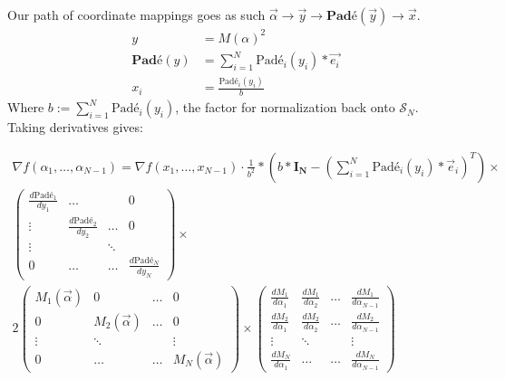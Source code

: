 \documentclass[10pt]{article}
\begin{document}
Our path of coordinate mappings goes as such $\vec{\alpha} \to \vec{y} \to {\textbf{Pad\'{e}}(\vec{y})} \to \vec{x}$. 
\begin{align*}
	y &= M(\alpha)^2 \\
	\textbf{Pad\'{e}}(y) &= \sum_{i=1}^N \text{Pad\'{e}}_i(y_i)* \vec{e_i} \\ 
	x_i &= \frac{\text{Pad\'{e}}_i(y_i)}{b}
\end{align*}
Where $b := \sum_{i=1}^N \text{Pad\'{e}}_i(y_i) $, the factor for normalization back onto $\mathcal{S}_N$. \\

Taking derivatives gives:

\begin{multline}
\label{gradient}
\tag{$\star$}
\nabla f(\alpha_1, \dots, \alpha_{N-1}) = \nabla f(x_1, \dots, x_{N-1}) 
\cdot 
\frac{1}{b^2} * \left(b * \mathbf{I_N}  - (\sum_{i=1}^N \text{Pad\'{e}}_i(y_i) * \vec{e}_i)^T \right)
\times \\
\begin{pmatrix}
	\frac{d\text{Pad\'{e}}_1}{dy_1} & \dots & & 0 \\ 
	\vdots & \frac{d\text{Pad\'{e}}_2}{dy_2} & \dots & 0 \\
	\vdots & & \ddots \\
	0 & \dots& \dots & \frac{d\text{Pad\'{e}}_N}{dy_N}
\end{pmatrix}
\times \\
2 \begin{pmatrix}
	 M_1(\vec{\alpha}) & 0 & \dots & 0 \\ 0 & M_2(\vec{\alpha}) & \dots & 0  \\ \vdots & \ddots & & \vdots \\ 0 & \dots & \dots & M_N(\vec{\alpha}) 
 \end{pmatrix}
\times 
\begin{pmatrix}
	\frac{dM_1}{d\alpha_1} & \frac{dM_1}{d\alpha_2} & \dots & \frac{dM_1}{d\alpha_{N-1}} \\ \frac{dM_2}{d\alpha_1} & \frac{dM_2}{d\alpha_2} & \dots & \frac{dM_2}{d\alpha_{N-1}} \\ \vdots & \ddots & & \vdots\\ \frac{dM_N}{d\alpha_1} & \dots & \dots & \frac{dM_N}{d\alpha_{N-1}} 
\end{pmatrix} 
\end{multline}
\end{document}
